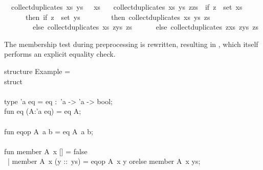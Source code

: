 \begin{isabellebody}
\ \ {\isachardoublequoteopen}collect{\isacharunderscore}duplicates\ xs\ ys\ {\isacharbrackleft}{\isacharbrackright}\ {\isacharequal}\ xs{\isachardoublequoteclose}\isanewline
\ \ {\isacharbar}\ {\isachardoublequoteopen}collect{\isacharunderscore}duplicates\ xs\ ys\ {\isacharparenleft}z{\isacharhash}zs{\isacharparenright}\ {\isacharequal}\ {\isacharparenleft}if\ z\ {\isasymin}\ set\ xs\isanewline
\ \ \ \ \ \ then\ if\ z\ {\isasymin}\ set\ ys\isanewline
\ \ \ \ \ \ \ \ then\ collect{\isacharunderscore}duplicates\ xs\ ys\ zs\isanewline
\ \ \ \ \ \ \ \ else\ collect{\isacharunderscore}duplicates\ xs\ {\isacharparenleft}z{\isacharhash}ys{\isacharparenright}\ zs\isanewline
\ \ \ \ \ \ else\ collect{\isacharunderscore}duplicates\ {\isacharparenleft}z{\isacharhash}xs{\isacharparenright}\ {\isacharparenleft}z{\isacharhash}ys{\isacharparenright}\ zs{\isacharparenright}{\isachardoublequoteclose}%
\endisatagquote
{\isafoldquote}%
%
\isadelimquote
%
\endisadelimquote
%
\begin{isamarkuptext}%
\noindent The membership test during preprocessing is rewritten,
  resulting in , which itself
  performs an explicit equality check.%
\end{isamarkuptext}%
\isamarkuptrue%
%
\isadelimquote
%
\endisadelimquote
%
\isatagquote
%
\begin{isamarkuptext}%
\isaverbatim%
\noindent%
\hspace*{0pt}structure Example = \\
\hspace*{0pt}struct\\
\hspace*{0pt}\\
\hspace*{0pt}type 'a eq = {}eq :~'a -> 'a -> bool{};\\
\hspace*{0pt}fun eq (A{}:'a eq) = {}eq A{};\\
\hspace*{0pt}\\
\hspace*{0pt}fun eqop A{}~a b = eq A{}~a b;\\
\hspace*{0pt}\\
\hspace*{0pt}fun member A{}~x [] = false\\
\hspace*{0pt} ~| member A{}~x (y ::~ys) = eqop A{}~x y orelse member A{}~x ys;\\

\end{isamarkuptext}
\end{isabellebody}
